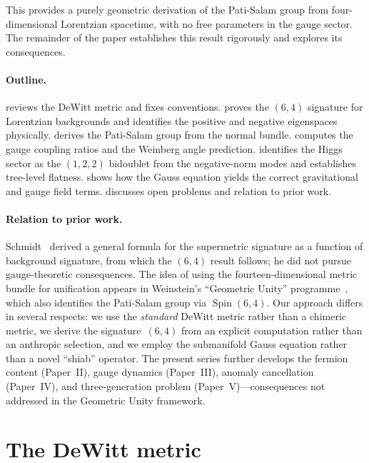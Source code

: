 \documentclass[12pt,a4paper]{article}
\theoremstyle{definition}
\newcommand{\Spin}{\operatorname{Spin}}
\begin{document}
This provides a purely geometric derivation of the Pati-Salam group from four-dimensional Lorentzian spacetime, with no free parameters in the gauge sector.
The remainder of the paper establishes this result rigorously and explores its consequences.

\paragraph{Outline.}
 reviews the DeWitt metric and fixes conventions.
 proves the $(6,4)$ signature for Lorentzian backgrounds and identifies the positive and negative eigenspaces physically.
 derives the Pati-Salam group from the normal bundle.
 computes the gauge coupling ratios and the Weinberg angle prediction.
 identifies the Higgs sector as the $(1,2,2)$ bidoublet from the negative-norm modes and establishes tree-level flatness.
 shows how the Gauss equation yields the correct gravitational and gauge field terms.
 discusses open problems and relation to prior work.

\paragraph{Relation to prior work.}
Schmidt~\cite{Schmidt1989} derived a general formula for the supermetric signature as a function of background signature, from which the $(6,4)$ result follows; he did not pursue gauge-theoretic consequences.
The idea of using the fourteen-dimensional metric bundle for unification appears in Weinstein's ``Geometric Unity'' programme~\cite{Weinstein2013,Weinstein2021}, which also identifies the Pati-Salam group via $\Spin(6,4)$.
Our approach differs in several respects: we use the \emph{standard} DeWitt metric rather than a chimeric metric, we derive the signature~$(6,4)$ from an explicit computation rather than an anthropic selection, and we employ the submanifold Gauss equation rather than a novel ``shiab'' operator.
The present series further develops the fermion content (Paper~II), gauge dynamics (Paper~III), anomaly cancellation (Paper~IV), and three-generation problem (Paper~V)---consequences not addressed in the Geometric Unity framework.


\section{The DeWitt metric}
\label{sec:dewitt}
\end{document}
